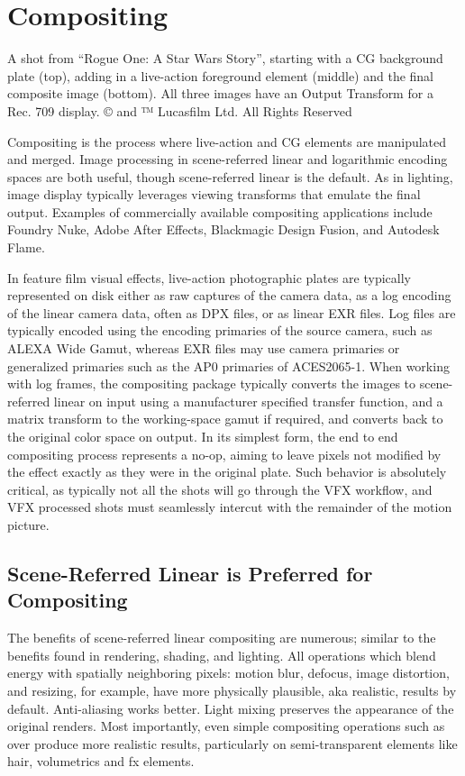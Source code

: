 \section{Compositing}




A shot from “Rogue One: A Star Wars Story”, starting with a CG background plate (top), adding in a live-action foreground element (middle) and the final composite image (bottom). All three images have an Output Transform for a Rec. 709 display.
© and ™ Lucasfilm Ltd. All Rights Reserved

Compositing is the process where live-action and CG elements are manipulated and merged. Image processing in scene-referred linear and logarithmic encoding spaces are both useful, though scene-referred linear is the default. As in lighting, image display typically leverages viewing transforms that emulate the final output. Examples of commercially available compositing applications include Foundry Nuke, Adobe After Effects, Blackmagic Design Fusion, and Autodesk Flame.

In feature film visual effects, live-action photographic plates are typically represented on disk either as raw captures of the camera data, as a log encoding of the linear camera data, often as DPX files, or as linear EXR files. Log files are typically encoded using the encoding primaries of the source camera, such as ALEXA Wide Gamut, whereas EXR files may use camera primaries or generalized primaries such as the AP0 primaries of ACES2065-1.  When working with log frames, the compositing package typically converts the images to scene-referred linear on input using a manufacturer specified transfer function, and a matrix transform to the working-space gamut if required, and converts back to the original color space on output. In its simplest form, the end to end compositing process represents a no-op, aiming to leave pixels not modified by the effect exactly as they were in the original plate. Such behavior is absolutely critical, as typically not all the shots will go through the VFX workflow, and VFX processed shots must seamlessly intercut with the remainder of the motion picture.

\subsection{Scene-Referred Linear is Preferred for Compositing}

The benefits of scene-referred linear compositing are numerous; similar to the benefits found in rendering, shading, and lighting. All operations which blend energy with spatially neighboring pixels: motion blur, defocus, image distortion, and resizing, for example, have more physically plausible, aka realistic, results by default. Anti-aliasing works better. Light mixing preserves the appearance of the original renders. Most importantly, even simple compositing operations such as over produce more realistic results, particularly on semi-transparent elements like hair, volumetrics and fx elements.


